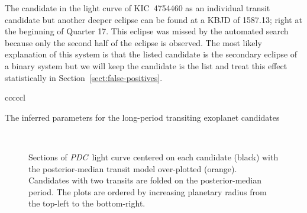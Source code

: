 \documentclass[manuscript, letterpaper]{aastex6}
\newcommand{\project}[1]{\textsl{#1}}
\newcommand{\pdc}{\project{PDC}}
\newcommand{\dfmfiglabel}[1]{\label{fig:#1}}
\newcommand{\sectionname}{Section}
\newcommand{\sectref}[1]{\ref{sect:#1}}
\newcommand{\Sect}[1]{\sectionname~\sectref{#1}}
\newcommand{\sect}[1]{\Sect{#1}}
\begin{document}
The candidate in the light curve of KIC~4754460 as an individual transit
candidate but another deeper eclipse can be found at a KBJD of 1587.13; right
at the beginning of Quarter 17.
This eclipse was missed by the automated search because only the second half
of the eclipse is observed.
The most likely explanation of this system is that the listed candidate is the
secondary eclipse of a binary system but we will keep the candidate is the
list and treat this effect statistically in \sect{false-positives}.

\begin{floattable}
\begin{deluxetable}{cccccl}
\tabletypesize{\footnotesize}
\caption{The inferred parameters for the long-period transiting exoplanet
candidates \label{tab:catalog}}

\end{deluxetable}
\end{floattable}

\begin{figure}[p]~\\
\begin{center}

\end{center}
\caption{%
Sections of \pdc\ light curve centered on each candidate (black) with the
posterior-median transit model over-plotted (orange).
Candidates with two transits are folded on the posterior-median period.
The plots are ordered by increasing planetary radius from the top-left to the
bottom-right.
\dfmfiglabel{light-curves}}
\end{figure}
\end{document}
